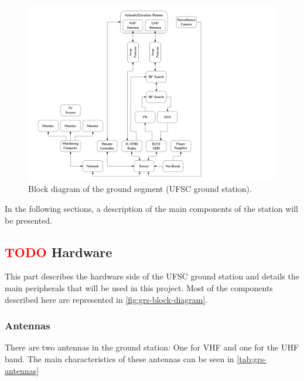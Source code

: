 \begin{figure}[!ht]
    \begin{center}
        \includegraphics[width=\textwidth]{figures/grs-block-diagram.pdf}
        \caption{Block diagram of the ground segment (UFSC ground station).}
        \label{fig:grs-block-diagram}
    \end{center}
\end{figure}

In the following sections, a description of the main components of the station will be presented.

\subsection{ \textcolor{red}{TODO} Hardware}

This part describes the hardware side of the UFSC ground station and details the main peripherals that will be used in this project. Most of the components described here are represented in \autoref{fig:grs-block-diagram}.

\subsubsection{Antennas}

There are two antennas in the ground station: One for VHF and one for the UHF band. The main characteristics of these antennas can be seen in \autoref{tab:grs-antennas}

